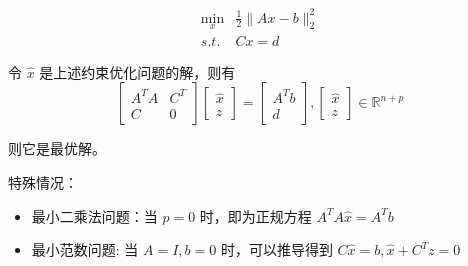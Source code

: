 \begin{problem}
    $$\begin{aligned}
        \min _{x} & \frac{1}{2}\|A x-b\|_{2}^{2}\\
        s.t. & C x=d
    \end{aligned}$$
\end{problem}

\begin{theorem}
    令 $ \hat{x} $ 是上述约束优化问题的解，则有
$$
\left[\begin{array}{cc}
A^{T} A & C^{T} \\
C& 0
\end{array}\right]\left[\begin{array}{l}
\hat{x} \\
z
\end{array}\right]=\left[\begin{array}{l}
A^{T} b \\
d
\end{array}\right],\left[\begin{array}{l}
\hat{x} \\
z
\end{array}\right] \in \mathbb{R}^{n+p}
$$

则它是最优解。
\end{theorem}


特殊情况：

\begin{itemize}
    \item 最小二乘法问题：当 $ p=0 $ 时，即为正规方程 $ A^{T} A \hat{x}=A^{T} b $
    \item 最小范数问题: 当 $ A=I, b=0 $ 时，可以推导得到 $ C \hat{x}=b, \hat{x}+C^{T} z=0 $
\end{itemize}


